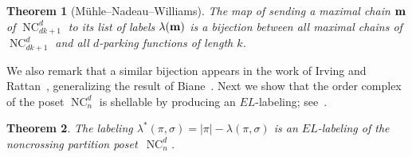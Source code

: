 \documentclass[11pt]{amsart}
\newtheorem{theorem}{Theorem}[section]
\numberwithin{equation}{section}
\DeclareMathOperator{\NC}{NC}
\begin{document}
\begin{theorem}[M\"uhle--Nadeau--Williams]
The map of sending a maximal chain ${\bf m}$ of $\NC^{d}_{dk+1}$
to its list of labels $\lambda({\bf m})$
is a bijection between all 
maximal chains of $\NC^{d}_{dk+1}$
and all $d$-parking functions of length $k$.
\label{theorem_list_of_labels_bijection}
\end{theorem}

We also remark that a similar bijection appears in the work of
Irving and Rattan~\cite[Proposition~1.6]{Irving_Rattan}, generalizing
the result of Biane~\cite[Theorem~3.1]{Biane}.
Next we show that the order complex of the poset $\NC^{d}_{n}$
is shellable by producing an $EL$-labeling;
see~\cite[Definition 3.2.1]{Wachs_Poset_topology}.

\begin{theorem}
The labeling
$\lambda^{*}(\pi,\sigma) = |\pi| - \lambda(\pi,\sigma)$
is an $EL$-labeling of the noncrossing partition poset~$\NC^{d}_{n}$.
\label{theorem_EL}
\end{theorem}
\end{document}
